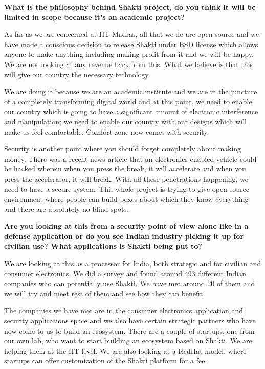 \begin{multicols}{2}
{\bf What is the philosophy behind Shakti project, do you think it will be limited in scope because it's an academic project?}

As far as we are concerned at IIT Madras, all that we do are open source and we have made a conscious decision to release Shakti under BSD license which allows anyone to make anything including making profit from it and we will be happy. We are not looking at any revenue back from this. What we believe is that this will give our country the necessary technology.

We are doing it because we are an academic institute and we are in the juncture of a completely transforming digital world and at this point, we need to enable our country which is going to have a significant amount of electronic interference and manipulation; we need to enable our country with our designs which will make us feel comfortable. Comfort zone now comes with security.

Security is another point where you should forget completely about making money. There was a recent news article that an electronics-enabled vehicle could be hacked wherein when you press the break, it will accelerate and when you press the accelerator, it will break. With all these penetrations happening, we need to have a secure system. This whole project is trying to give open source environment where people can build boxes about which they know everything and there are absolutely no blind spots.

{\bf Are you looking at this from a security point of view alone like in a defense application or do you see Indian industry picking it up for civilian use? What applications is Shakti being put to?}

We are looking at this as a processor for India, both strategic and for civilian and consumer electronics. We did a survey and found around 493 different Indian companies who can potentially use Shakti. We have met around 20 of them and we will try and meet rest of them and see how they can benefit.

The companies we have met are in the consumer electronics application and security applications space and we also have certain strategic partners who have now come to us to build an ecosystem. There are a couple of startups, one from our own lab, who want to start building an ecosystem based on Shakti. We are helping them at the IIT level. We are also looking at a RedHat model, where startups can offer customization of the Shakti platform for a fee.


\end{multicols}
